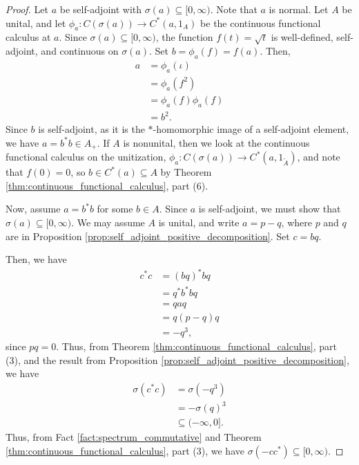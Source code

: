 \begin{proof}
  Let $a$ be self-adjoint with $\sigma\left( a \right)\subseteq [0,\infty)$. Note that $a$ is normal. Let $A$ be unital, and let $\phi_a\colon C\left( \sigma\left( a \right) \right)\rightarrow C^{\ast}\left( a,1_A \right)$ be the continuous functional calculus at $a$. Since $\sigma\left( a \right)\subseteq [0,\infty)$, the function $f\left( t \right) = \sqrt{t}$ is well-defined, self-adjoint, and continuous on $\sigma\left( a \right)$. Set $b = \phi_a\left( f \right) = f(a)$. Then,
  \begin{align*}
    a &= \phi_a\left( \iota \right)\\
      &= \phi_a\left( f^2 \right)\\
      &= \phi_a\left( f \right)\phi_a\left( f \right)\\
      &= b^2.
  \end{align*}
  Since $b$ is self-adjoint, as it is the $\ast$-homomorphic image of a self-adjoint element, we have $a = b^{\ast}b\in A_{+}$. If $A$ is nonunital, then we look at the continuous functional calculus on the unitization, $\phi_a\colon C\left( \sigma\left( a \right) \right)\rightarrow C^{\ast}\left( a,1_{\widetilde{A}} \right)$, and note that $f(0) = 0$, so $b\in C^{\ast}\left( a \right)\subseteq A$ by Theorem \ref{thm:continuous_functional_calculus}, part (6).\newline

  Now, assume $a = b^{\ast}b$ for some $b\in A$. Since $a$ is self-adjoint, we must show that $\sigma\left( a \right)\subseteq [0,\infty)$. We may assume $A$ is unital, and write $a = p-q$, where $p$ and $q$ are in Proposition \ref{prop:self_adjoint_positive_decomposition}. Set $c = bq$.\newline

  Then, we have
  \begin{align*}
    c^{\ast}c &= \left( bq \right)^{\ast}bq\\
              &= q^{\ast}b^{\ast}bq\\
              &= qaq\\
              &= q\left( p-q \right)q\\
              &= -q^3,
  \end{align*}
  since $pq = 0$. Thus, from Theorem \ref{thm:continuous_functional_calculus}, part (3), and the result from Proposition \ref{prop:self_adjoint_positive_decomposition}, we have
  \begin{align*}
    \sigma\left( c^{\ast}c \right)&=\sigma\left( -q^3 \right)\\
                                  &= -\sigma\left( q \right)^3\\
                                  &\subseteq (-\infty,0].
  \end{align*}
  Thus, from Fact \ref{fact:spectrum_commutative} and Theorem \ref{thm:continuous_functional_calculus}, part (3), we have $\sigma\left( -cc^{\ast} \right)\subseteq [0,\infty)$.\newline


\end{proof}

